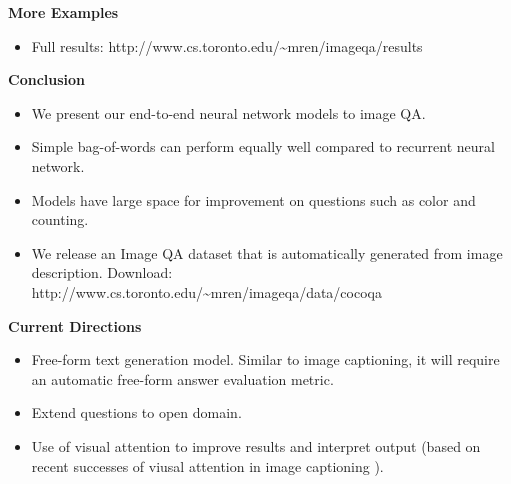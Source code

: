 \documentclass[serif,mathserif,final]{beamer}
\renewcommand{\*}[1]{\textbf{#1}}
\begin{document}
\begin{frame}{}
\begin{columns}[t]
\begin{column}{0.32\linewidth}
\begin{block}{\bf{\large More Examples}}
\begin{itemize}
\item Full results: http://www.cs.toronto.edu/\textasciitilde mren/imageqa/results
\end{itemize}
\end{block}
\vfill

\begin{block}{\bf{\large Conclusion}}
  \begin{itemize}
  \item We present our end-to-end neural network models to image QA.
  \item Simple bag-of-words can perform equally well compared to recurrent 
  neural network.
  \item Models have large space for improvement on questions such as color and counting.
  \item We release an Image QA dataset that is automatically generated from image description. Download: http://www.cs.toronto.edu/\textasciitilde mren/imageqa/data/cocoqa
  \end{itemize}
\end{block}
\vfill

\begin{block}{\bf{\large Current Directions}}
  \begin{itemize}
  \item Free-form text generation model. Similar to image captioning, it will require an automatic free-form answer evaluation metric.
  \item Extend questions to open domain.
  \item Use of visual attention to improve results and interpret output (based on recent successes of viusal attention in image captioning \cite{xu15}).
  \end{itemize}
\end{block}
\vfill


\end{column}
\end{columns}
\end{frame}
\end{document}
